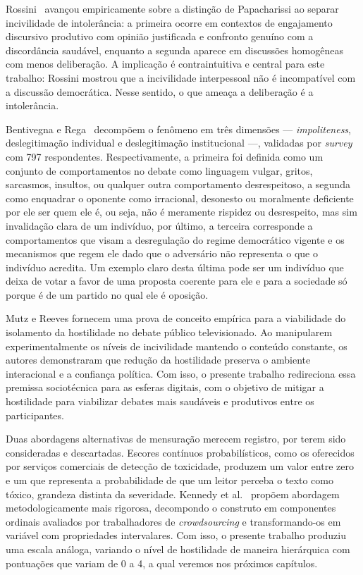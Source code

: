 \documentclass[conference]{IEEEtran} \IEEEoverridecommandlockouts %
\begin{document}
Rossini~\cite{rossini2022beyond} avançou empiricamente sobre a distinção de
Papacharissi ao separar incivilidade de intolerância: a primeira ocorre em
contextos de engajamento discursivo produtivo com opinião justificada e
confronto genuíno com a discordância saudável, enquanto a segunda aparece em
discussões homogêneas com menos deliberação. A implicação é contraintuitiva e
central para este trabalho: Rossini mostrou que a incivilidade interpessoal não é incompatível com
a discussão democrática. Nesse sentido, o que ameaça a deliberação é a intolerância. 

Bentivegna e Rega~\cite{bentivegna2022searching} decompõem o fenômeno em três
dimensões — \textit{impoliteness}, deslegitimação individual e deslegitimação
institucional —, validadas por \textit{survey} com 797 respondentes. Respectivamente, a primeira foi definida como um conjunto de comportamentos no debate como linguagem vulgar, gritos, sarcasmos, insultos, ou qualquer outra comportamento desrespeitoso, a segunda como enquadrar o oponente como irracional, desonesto ou moralmente deficiente por ele ser quem ele é, ou seja, não é meramente rispidez ou desrespeito, mas sim invalidação clara de um indivíduo, por último, a terceira corresponde a comportamentos que visam a desregulação do regime democrático vigente e os mecanismos que regem ele dado que o adversário não representa o que o indivíduo acredita. Um exemplo claro desta última pode ser um indivíduo que deixa de votar a favor de uma proposta coerente para ele e para a sociedade só porque é de um partido no qual ele é oposição. 

Mutz e Reeves \cite{mutz2005new} fornecem uma prova de conceito empírica para a viabilidade do isolamento da hostilidade no debate público televisionado. Ao manipularem experimentalmente os níveis de incivilidade mantendo o conteúdo constante, os autores demonstraram que redução da hostilidade preserva o ambiente interacional e a confiança política. Com isso, o presente trabalho redireciona essa premissa sociotécnica para as esferas digitais, com o objetivo de mitigar a hostilidade para viabilizar debates mais saudáveis e produtivos entre os participantes.

Duas abordagens alternativas de mensuração merecem registro, por terem sido
consideradas e descartadas. Escores contínuos probabilísticos, como os
oferecidos por serviços comerciais de detecção de toxicidade, produzem um valor
entre zero e um que representa a probabilidade de que um leitor perceba o texto
como tóxico, grandeza distinta da severidade. Kennedy et al.~\cite{kennedy2020constructing}
propõem abordagem metodologicamente mais rigorosa, decompondo o construto em
componentes ordinais avaliados por trabalhadores de \textit{crowdsourcing} e
transformando-os em variável com propriedades intervalares. Com isso, o presente trabalho produziu uma escala análoga, variando o nível de hostilidade de maneira hierárquica com pontuações que variam de 0 a 4, a qual veremos nos próximos capítulos. 
\end{document}
